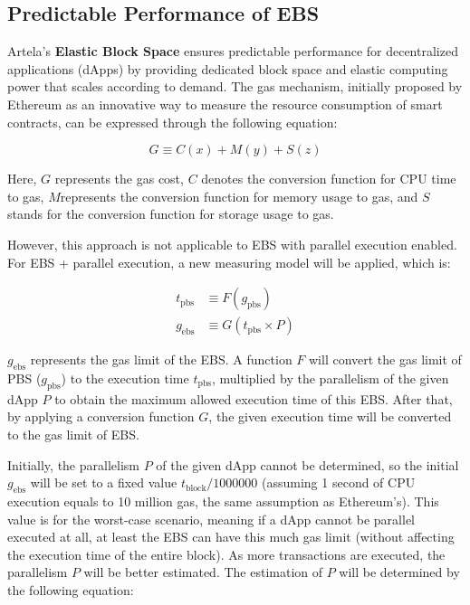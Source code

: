 \subsection{Predictable Performance of EBS}

Artela's \textbf{Elastic Block Space} ensures predictable performance for decentralized applications (dApps) by providing dedicated block space and elastic computing power that scales according to demand. The gas mechanism, initially proposed by Ethereum as an innovative way to measure the resource consumption of smart contracts, can be expressed through the following equation:

\begin{equation}
G \equiv C(x) + M(y) +  S(z)
\end{equation}

Here, $G$ represents the gas cost, $C$ denotes the conversion function for CPU time to gas, $M$represents the conversion function for memory usage to gas, and $S$ stands for the conversion function for storage usage to gas.

However, this approach is not applicable to EBS with parallel execution enabled. For EBS + parallel execution, a new measuring model will be applied, which is:

\begin{align}
t_\text{pbs} &\equiv F(g_\text{pbs}) \\
g_\text{ebs} &\equiv G( t_\text{pbs}  \times P) 
\end{align}

$g_\text{ebs}$ represents the gas limit of the EBS. A function $F$ will convert the gas limit of PBS ($g_\text{pbs}$) to the execution time $t_\text{pbs}$, multiplied by the parallelism of the given dApp $P$ to obtain the maximum allowed execution time of this EBS. After that, by applying a conversion function $G$, the given execution time will be converted to the gas limit of EBS.

Initially, the parallelism $P$ of the given dApp cannot be determined, so the initial $g_\text{ebs}$ will be set to a fixed value $t_\text{block} / 1000000$ (assuming 1 second of CPU execution equals to 10 million gas, the same assumption as Ethereum’s). This value is for the worst-case scenario, meaning if a dApp cannot be parallel executed at all, at least the EBS can have this much gas limit (without affecting the execution time of the entire block). As more transactions are executed, the parallelism $P$ will be better estimated. The estimation of $P$ will be determined by the following equation:

